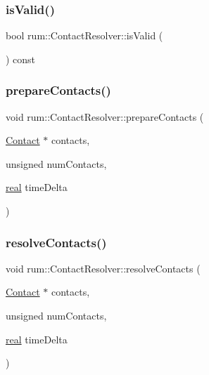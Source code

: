 \mbox{\label{classrum_1_1_contact_resolver_aba2afe22f39a99cedf5cc3e6b22cabc4}} 
\subsubsection{\texorpdfstring{is\+Valid()}{isValid()}}
{\footnotesize\ttfamily bool rum\+::\+Contact\+Resolver\+::is\+Valid (\begin{DoxyParamCaption}{ }\end{DoxyParamCaption}) const}

\mbox{\label{classrum_1_1_contact_resolver_a316867d8043a281a4d1d1d6e237ba7d4}} 
\subsubsection{\texorpdfstring{prepare\+Contacts()}{prepareContacts()}}
{\footnotesize\ttfamily void rum\+::\+Contact\+Resolver\+::prepare\+Contacts (\begin{DoxyParamCaption}\item[{\mbox{\hyperlink{classrum_1_1_contact}{Contact}} $\ast$}]{contacts,  }\item[{unsigned}]{num\+Contacts,  }\item[{\mbox{\hyperlink{namespacerum_a7e8cca23573d5eaead0f138cbaa4862c}{real}}}]{time\+Delta }\end{DoxyParamCaption})}

\mbox{\label{classrum_1_1_contact_resolver_a5250cbfb65f911ea854ca05b39bbbca0}} 
\subsubsection{\texorpdfstring{resolve\+Contacts()}{resolveContacts()}}
{\footnotesize\ttfamily void rum\+::\+Contact\+Resolver\+::resolve\+Contacts (\begin{DoxyParamCaption}\item[{\mbox{\hyperlink{classrum_1_1_contact}{Contact}} $\ast$}]{contacts,  }\item[{unsigned}]{num\+Contacts,  }\item[{\mbox{\hyperlink{namespacerum_a7e8cca23573d5eaead0f138cbaa4862c}{real}}}]{time\+Delta }\end{DoxyParamCaption})}

